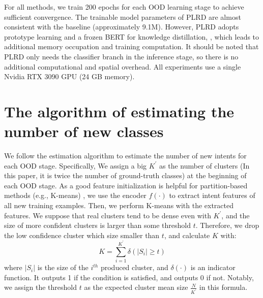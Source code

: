 \documentclass[11pt]{article}
\begin{document}
For all methods, we train 200 epochs for each OOD learning stage to achieve sufficient convergence. The trainable model parameters of PLRD are almost consistent with the baseline (approximately 9.1M). However, PLRD adopts prototype learning and a frozen BERT for knowledge distillation, , which leads to additional memory occupation and training computation. It should be noted that PLRD only needs the classifier branch in the inference stage, so there is no additional computational and spatial overhead. All experiments use a single Nvidia RTX 3090 GPU (24 GB memory).


\section{The algorithm of estimating the number of new classes}
\label{app:predict_k}

We follow the estimation algorithm \cite{zhang2021discovering} to estimate the number of new intents for each OOD stage. Specifically, We assign a big $K^{'}$ as the number of clusters (In this paper, it is twice the number of ground-truth classes) at the beginning of each OOD stage.  As a good feature initialization is helpful for partition-based methods (e.g., K-means) \cite{platt1999probabilistic}, we use the encoder $f(\cdot)$ to extract intent features of all new training examples. Then, we perform K-means with the extracted features. We suppose that real clusters tend to be dense even with $K^{'}$, and the size of more confident clusters is larger than some threshold $t$. Therefore, we drop the low confidence cluster which size smaller than $t$, and calculate $K$ with:
\begin{equation}
K=\sum^{K^{'}}_{i=1}\delta(|S_i| \ge t)
\end{equation}
where $|S_i|$ is the size of the $i^{th}$ produced cluster, and $\delta(\cdot)$ is an indicator function. It outputs 1 if the condition is satisfied, and outputs 0 if not. Notably, we assign the threshold $t$ as the expected cluster mean size $\frac{N}{K^{'}}$ in this formula.



\end{document}
